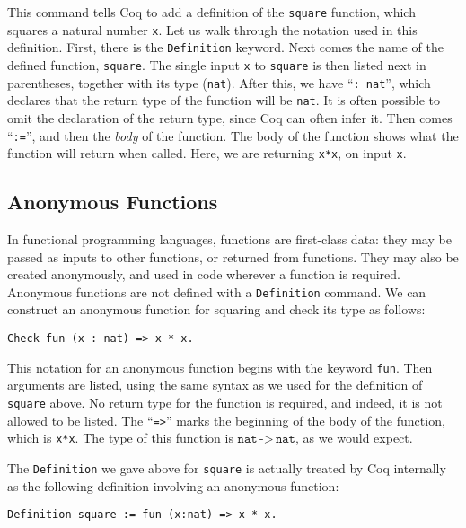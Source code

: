 \documentclass{book}[12pt]
\begin{document}
\noindent This command tells Coq to add a definition of the
\texttt{square} function, which squares a natural number \texttt{x}.
Let us walk through the notation used in this definition.  First,
there is the \texttt{Definition} keyword.  Next comes the name of the
defined function, \texttt{square}.  The single input \texttt{x} to
\texttt{square} is then listed next in parentheses, together with its
type (\texttt{nat}).  After this, we have ``\texttt{: nat}'', which
declares that the return type of the function will be \texttt{nat}.
It is often possible to omit the declaration of the return type, since
Coq can often infer it.  Then comes ``\texttt{:=}'', and then the
\emph{body} of the function.  The body of the function shows what the
function will return when called.  Here, we are returning
\texttt{x*x}, on input \texttt{x}.

\subsection{Anonymous Functions}

In functional programming languages, functions are first-class data:
they may be passed as inputs to other functions, or returned from
functions.  They may also be created anonymously, and used in code
wherever a function is required.  Anonymous functions are not defined
with a \texttt{Definition} command.  We can construct an anonymous
function for squaring and check its type as follows:

\begin{verbatim}
Check fun (x : nat) => x * x.
\end{verbatim}

\noindent This notation for an anonymous function begins with the
keyword \texttt{fun}.  Then arguments are listed, using the same
syntax as we used for the definition of \texttt{square} above.  No
return type for the function is required, and indeed, it is not
allowed to be listed.  The ``\texttt{=>}'' marks the beginning of the
body of the function, which is \texttt{x*x}.  The type of this function
is $\texttt{nat}\,\texttt{->}\,\texttt{nat}$, as we would expect.

The \texttt{Definition} we gave above for \texttt{square} is actually
treated by Coq internally as the following definition involving an
anonymous function:

\begin{verbatim}
Definition square := fun (x:nat) => x * x.
\end{verbatim}
\end{document}
